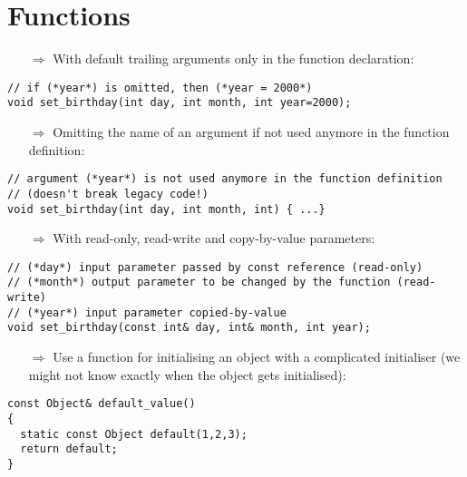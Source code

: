 \documentclass[10pt]{article}
\begin{document}
\section{Functions}
\small
\begin{enumerate}
\item[$\Rightarrow$] With default trailing arguments only in the function declaration:
\end{enumerate}
\begin{lstlisting}
// if (*year*) is omitted, then (*year = 2000*)
void set_birthday(int day, int month, int year=2000);
\end{lstlisting}
\begin{enumerate}
\item[$\Rightarrow$] Omitting the name of an argument if not used anymore in the function definition:
\end{enumerate}
\begin{lstlisting}
// argument (*year*) is not used anymore in the function definition
// (doesn't break legacy code!)
void set_birthday(int day, int month, int) { ...}
\end{lstlisting}
\begin{enumerate}
\item[$\Rightarrow$] With read-only, read-write and copy-by-value parameters:
\end{enumerate}
\begin{lstlisting}
// (*day*) input parameter passed by const reference (read-only)
// (*month*) output parameter to be changed by the function (read-write)
// (*year*) input parameter copied-by-value
void set_birthday(const int& day, int& month, int year);
\end{lstlisting}
\begin{enumerate}
\item[$\Rightarrow$] Use a function for initialising an object with a complicated initialiser (we might not
know exactly when the object gets initialised):
\end{enumerate}
\begin{lstlisting}
const Object& default_value()
{
  static const Object default(1,2,3);
  return default;
}
\end{lstlisting}
\end{document}
